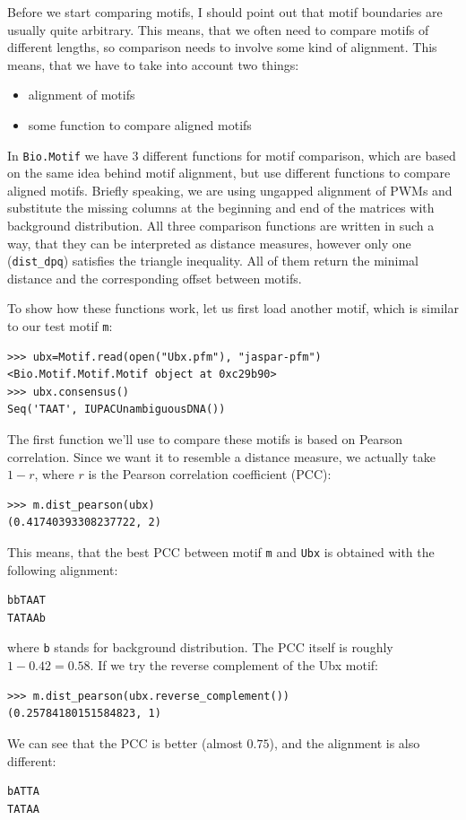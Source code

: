 \documentclass{report}
\begin{document}
Before we start comparing motifs, I should point out that motif
boundaries are usually quite arbitrary. This means, that we often need
to compare motifs of different lengths, so comparison needs to involve
some kind of alignment.  This means, that we have to take into account two things:
\begin{itemize}
\item alignment of motifs
\item some function to compare aligned motifs
\end{itemize}
In \verb|Bio.Motif| we have 3 different functions for motif
comparison, which are based on the same idea behind motif alignment,
but use different functions to compare aligned motifs. Briefly
speaking, we are using ungapped alignment of PWMs and substitute the
missing columns at the beginning and end of the matrices with
background distribution. All three comparison functions are written in
such a way, that they can be interpreted as distance measures, however
only one (\verb|dist_dpq|) satisfies the triangle inequality. All of
them return the minimal distance and the corresponding offset between
motifs.

To show how these functions work, let us first load another motif,
which is similar to our test motif \verb|m|:
\begin{verbatim}
>>> ubx=Motif.read(open("Ubx.pfm"), "jaspar-pfm")
<Bio.Motif.Motif.Motif object at 0xc29b90>
>>> ubx.consensus()
Seq('TAAT', IUPACUnambiguousDNA())
\end{verbatim}

The first function we'll use to compare these motifs is based on
Pearson correlation. Since we want it to resemble a distance
measure, we actually take $1-r$, where $r$ is the Pearson correlation
coefficient (PCC):
\begin{verbatim}
>>> m.dist_pearson(ubx)
(0.41740393308237722, 2)
\end{verbatim}
This means, that the best PCC between motif \verb|m| and  \verb|Ubx| is obtained with the following alignment:
\begin{verbatim}
bbTAAT
TATAAb
\end{verbatim}
where \verb|b| stands for background distribution. The PCC itself is
roughly $1-0.42=0.58$. If we try the reverse complement of the Ubx motif:

\begin{verbatim}
>>> m.dist_pearson(ubx.reverse_complement())
(0.25784180151584823, 1)
\end{verbatim}
We can see that the PCC is better (almost $0.75$), and the alignment is also different:
\begin{verbatim}
bATTA
TATAA
\end{verbatim}
\end{document}
